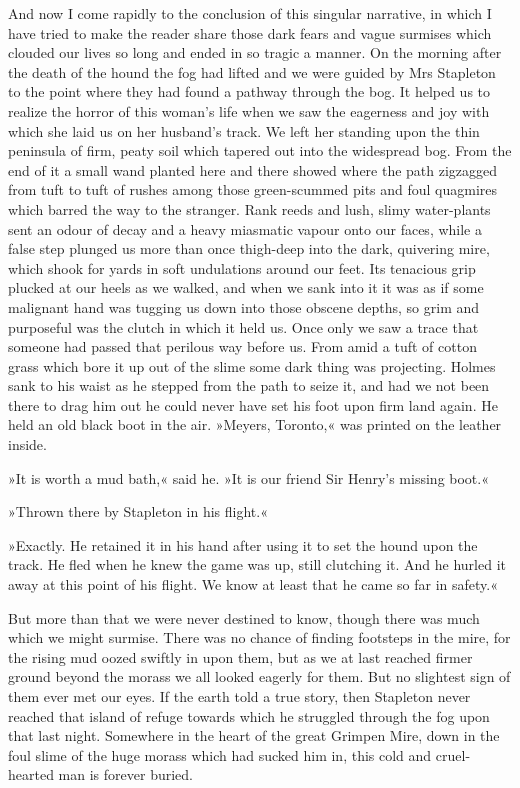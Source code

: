 And now I come rapidly to the conclusion of this singular narrative, in which I have tried to make the reader share those dark fears and vague surmises which clouded our lives so long and ended in so tragic a manner. On the morning after the death of the hound the fog had lifted and we were guided by Mrs Stapleton to the point where they had found a pathway through the bog. It helped us to realize the horror of this woman's life when we saw the eagerness and joy with which she laid us on her husband's track. We left her standing upon the thin peninsula of firm, peaty soil which tapered out into the widespread bog. From the end of it a small wand planted here and there showed where the path zigzagged from tuft to tuft of rushes among those green-scummed pits and foul quagmires which barred the way to the stranger. Rank reeds and lush, slimy water-plants sent an odour of decay and a heavy miasmatic vapour onto our faces, while a false step plunged us more than once thigh-deep into the dark, quivering mire, which shook for yards in soft undulations around our feet. Its tenacious grip plucked at our heels as we walked, and when we sank into it it was as if some malignant hand was tugging us down into those obscene depths, so grim and purposeful was the clutch in which it held us. Once only we saw a trace that someone had passed that perilous way before us. From amid a tuft of cotton grass which bore it up out of the slime some dark thing was projecting. Holmes sank to his waist as he stepped from the path to seize it, and had we not been there to drag him out he could never have set his foot upon firm land again. He held an old black boot in the air. »Meyers, Toronto,« was printed on the leather inside.

»It is worth a mud bath,« said he. »It is our friend Sir Henry's missing boot.«

»Thrown there by Stapleton in his flight.«

»Exactly. He retained it in his hand after using it to set the hound upon the track. He fled when he knew the game was up, still clutching it. And he hurled it away at this point of his flight. We know at least that he came so far in safety.«

But more than that we were never destined to know, though there was much which we might surmise. There was no chance of finding footsteps in the mire, for the rising mud oozed swiftly in upon them, but as we at last reached firmer ground beyond the morass we all looked eagerly for them. But no slightest sign of them ever met our eyes. If the earth told a true story, then Stapleton never reached that island of refuge towards which he struggled through the fog upon that last night. Somewhere in the heart of the great Grimpen Mire, down in the foul slime of the huge morass which had sucked him in, this cold and cruel-hearted man is forever buried.

